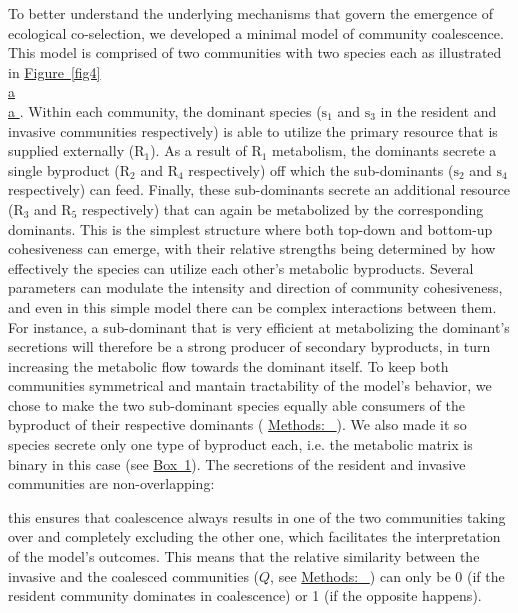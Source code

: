 \documentclass[a4paper,10pt]{article}
\newcommand{\figref}[2][]{%
  \hyperref[{#2}]{%
    Figure~\ref*{#2}%
    \ifx\\#1\\%
    \else
      #1%
    \fi
  }%
}
\newcommand{\methodsref}[1]{%
  \hyperref[{methods:#1}]{%
   Methods:~\nameref*{methods:#1}%
  }%
}
\begin{document}
To better understand the underlying mechanisms that govern
the emergence of ecological co-selection,
we developed a minimal model of community coalescence.
This model is comprised of two communities with two species each
as illustrated in \figref[a]{fig4}.
Within each community, the dominant species
($\mathrm{s}_1$ and $\mathrm{s}_3$ in the resident and invasive communities
respectively)
is able to utilize the primary resource that is supplied externally ($\mathrm{R}_1$).
As a result of $\mathrm{R}_1$ metabolism,
the dominants secrete a single byproduct
($\mathrm{R}_2$ and $\mathrm{R}_4$ respectively)
off which
the sub-dominants ($\mathrm{s}_2$ and $\mathrm{s}_4$ respectively) can feed.
Finally, these sub-dominants secrete an additional resource
($\mathrm{R}_3$ and $\mathrm{R}_5$ respectively)
that can again
be metabolized by the corresponding dominants.
This is the simplest structure where both top-down and bottom-up
cohesiveness can emerge, with their relative strengths being determined
by how effectively the species can utilize each other's metabolic byproducts.
Several parameters can modulate the intensity and direction of community cohesiveness,
and even in this simple model there can be complex interactions between them.
For instance, a sub-dominant that is very efficient at metabolizing the dominant's
secretions will therefore be a strong producer of secondary byproducts,
in turn increasing the metabolic flow towards the dominant itself.
To keep both communities symmetrical and
mantain tractability of the model's behavior, we chose to make
the two sub-dominant species equally able consumers of the
byproduct of their respective dominants
(\methodsref{sim-min}).
We also made it so species secrete only one type of byproduct each,
i.e. the metabolic matrix is binary in this case
(see \hyperref[box1]{Box~1}).
The secretions of the resident and invasive communities are
non-overlapping:

this ensures that coalescence always results in one of the two
communities taking over and completely excluding the other one,
which facilitates the interpretation of the model's outcomes.
This means that
the relative similarity between the invasive and the coalesced communities
($Q$, see \methodsref{metrics})
can only be 0 (if the resident community dominates in coalescence)
or 1 (if the opposite happens).
\end{document}
